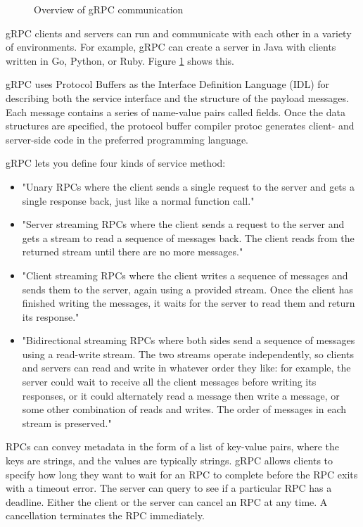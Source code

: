 \begin{figure}[h]
  \centering
  
  \caption{Overview of gRPC communication}
  \label{fig:grpcoverview}
\end{figure}

gRPC clients and servers can run and communicate with each other in a variety of environments. For example, gRPC can create a server in Java with clients written in Go, Python, or Ruby. Figure \ref{fig:grpcoverview} shows this.

gRPC uses Protocol Buffers as the Interface Definition Language (IDL) for describing both the service interface and the structure of the payload messages. Each message contains a series of name-value pairs called fields. Once the data structures are specified, the protocol buffer compiler protoc generates client- and server-side code in the preferred programming language.

gRPC lets you define four kinds of service method:
\begin{itemize}
    \item "Unary RPCs where the client sends a single request to the server and gets a single response back, just like a normal function call." \cite{grpc:concepts}
    \item "Server streaming RPCs where the client sends a request to the server and gets a stream to read a sequence of messages back. The client reads from the returned stream until there are no more messages." \cite{grpc:concepts}
    \item "Client streaming RPCs where the client writes a sequence of messages and sends them to the server, again using a provided stream. Once the client has finished writing the messages, it waits for the server to read them and return its response." \cite{grpc:concepts}
    \item "Bidirectional streaming RPCs where both sides send a sequence of messages using a read-write stream. The two streams operate independently, so clients and servers can read and write in whatever order they like: for example, the server could wait to receive all the client messages before writing its responses, or it could alternately read a message then write a message, or some other combination of reads and writes. The order of messages in each stream is preserved." \cite{grpc:concepts}
\end{itemize}

RPCs can convey metadata in the form of a list of key-value pairs, where the keys are strings, and the values are typically strings. gRPC allows clients to specify how long they want to wait for an RPC to complete before the RPC exits with a timeout error. The server can query to see if a particular RPC has a deadline. Either the client or the server can cancel an RPC at any time. A cancellation terminates the RPC immediately.

